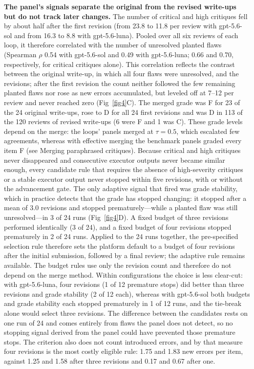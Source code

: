\documentclass[10pt,letterpaper]{article}
\begin{document}
\textbf{The panel's signals separate the original from the revised write-ups but do not track later changes.} The number of critical and high critiques fell by about half after the first revision (from 23.8 to 11.8 per review with gpt-5.6-sol and from 16.3 to 8.8 with gpt-5.6-luna). Pooled over all six reviews of each loop, it therefore correlated with the number of unresolved planted flaws (Spearman $\rho$ 0.54 with gpt-5.6-sol and 0.49 with gpt-5.6-luna; 0.66 and 0.70, respectively, for critical critiques alone). This correlation reflects the contrast between the original write-up, in which all four flaws were unresolved, and the revisions; after the first revision the count neither followed the few remaining planted flaws nor rose as new errors accumulated, but leveled off at 7--12 per review and never reached zero (Fig~\ref{fig4}C). The merged grade was F for 23 of the 24 original write-ups, rose to D for all 24 first revisions and was D in 113 of the 120 reviews of revised write-ups (6 were F and 1 was C). These grade levels depend on the merge: the loops' panels merged at $\tau=0.5$, which escalated few agreements, whereas with effective merging the benchmark panels graded every item F (see Merging paraphrased critiques). Because critical and high critiques never disappeared and consecutive executor outputs never became similar enough, every candidate rule that requires the absence of high-severity critiques or a stable executor output never stopped within five revisions, with or without the advancement gate. The only adaptive signal that fired was grade stability, which in practice detects that the grade has stopped changing: it stopped after a mean of 3.0 revisions and stopped prematurely---while a planted flaw was still unresolved---in 3 of 24 runs (Fig~\ref{fig4}D). A fixed budget of three revisions performed identically (3 of 24), and a fixed budget of four revisions stopped prematurely in 2 of 24 runs. Applied to the 24 runs together, the pre-specified selection rule therefore sets the platform default to a budget of four revisions after the initial submission, followed by a final review; the adaptive rule remains available. The budget rules use only the revision count and therefore do not depend on the merge method. Within configurations the choice is less clear-cut: with gpt-5.6-luna, four revisions (1 of 12 premature stops) did better than three revisions and grade stability (2 of 12 each), whereas with gpt-5.6-sol both budgets and grade stability each stopped prematurely in 1 of 12 runs, and the tie-break alone would select three revisions. The difference between the candidates rests on one run of 24 and comes entirely from flaws the panel does not detect, so no stopping signal derived from the panel could have prevented those premature stops. The criterion also does not count introduced errors, and by that measure four revisions is the most costly eligible rule: 1.75 and 1.83 new errors per item, against 1.25 and 1.58 after three revisions and 0.17 and 0.67 after one.
\end{document}
